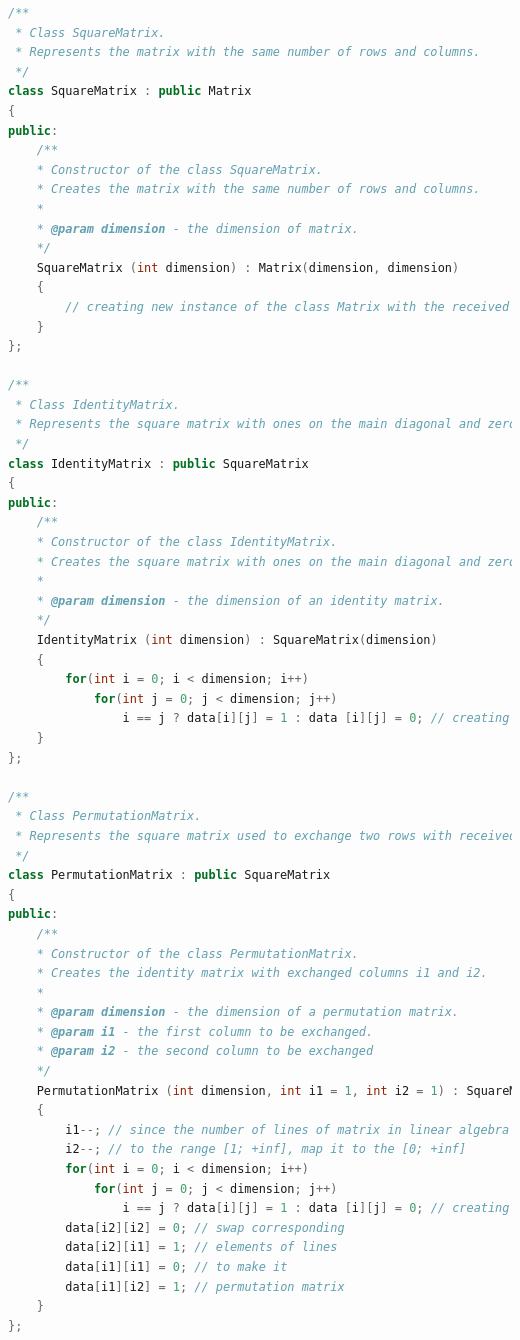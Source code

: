 \documentclass[11pt]{article}
\begin{document}
\begin{lstlisting}[language=C++, caption=Implementation of Predator-prey model]
/**
 * Class SquareMatrix.
 * Represents the matrix with the same number of rows and columns.
 */
class SquareMatrix : public Matrix
{
public:
    /**
    * Constructor of the class SquareMatrix.
    * Creates the matrix with the same number of rows and columns.
    *
    * @param dimension - the dimension of matrix.
    */
    SquareMatrix (int dimension) : Matrix(dimension, dimension)
    {
        // creating new instance of the class Matrix with the received number of rows and columns
    }
};

/**
 * Class IdentityMatrix.
 * Represents the square matrix with ones on the main diagonal and zeros elsewhere.
 */
class IdentityMatrix : public SquareMatrix
{
public:
    /**
    * Constructor of the class IdentityMatrix.
    * Creates the square matrix with ones on the main diagonal and zeros elsewhere.
    *
    * @param dimension - the dimension of an identity matrix.
    */
    IdentityMatrix (int dimension) : SquareMatrix(dimension)
    {
        for(int i = 0; i < dimension; i++)
            for(int j = 0; j < dimension; j++)
                i == j ? data[i][j] = 1 : data [i][j] = 0; // creating the identity matrix, set the main diagonal elements to ones and fill the rest of matrix with zeroes
    }
};

/**
 * Class PermutationMatrix.
 * Represents the square matrix used to exchange two rows with received indexes of the matrix.
 */
class PermutationMatrix : public SquareMatrix
{
public:
    /**
    * Constructor of the class PermutationMatrix.
    * Creates the identity matrix with exchanged columns i1 and i2.
    *
    * @param dimension - the dimension of a permutation matrix.
    * @param i1 - the first column to be exchanged.
    * @param i2 - the second column to be exchanged
    */
    PermutationMatrix (int dimension, int i1 = 1, int i2 = 1) : SquareMatrix(dimension)
    {
        i1--; // since the number of lines of matrix in linear algebra belongs
        i2--; // to the range [1; +inf], map it to the [0; +inf]
        for(int i = 0; i < dimension; i++)
            for(int j = 0; j < dimension; j++)
                i == j ? data[i][j] = 1 : data [i][j] = 0; // creating the identity matrix, set the main diagonal elements to ones and fill the rest of matrix with zeroes
        data[i2][i2] = 0; // swap corresponding
        data[i2][i1] = 1; // elements of lines
        data[i1][i1] = 0; // to make it
        data[i1][i2] = 1; // permutation matrix
    }
};


\end{lstlisting}
\end{document}
